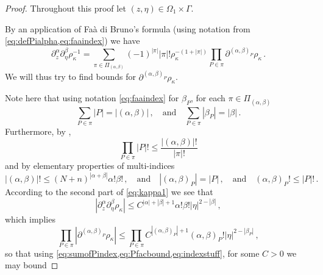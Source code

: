 \documentclass[
	fontsize=11pt, 
	twoside=false, 
	abstract=true, 
	a4paper,
]{scrartcl}
\newcommand{\abs}[1]{\left\lvert#1\right\rvert}
\newcommand{\del}{\partial}
\newcommand{\an}{\quad\text{and}\quad}
\begin{document}
\begin{proof} Throughout this proof let $(z,\eta) \in \Omega_1\times\Gamma$.

	By an application of Fa\`a di Bruno's formula (using notation from \cref{eq:defPialpha,eq:faaindex}) we have
	\begin{equation}\label{eq:applybruno}
		\del^\alpha_z\del^\beta_\eta\rho_\kappa^{-1} = \sum_{\pi\in\Pi_{(\alpha,\beta)}}(-1)^{\abs{\pi}}\abs{\pi}!\rho_\kappa^{-(1+\abs{\pi})}\prod_{P\in\pi} \del^{(\alpha,\beta)_P}\rho_\kappa\,.
	\end{equation}
	We will thus try to find bounds for $\del^{(\alpha,\beta)_P}\rho_\kappa$.

	Note here that using notation \cref{eq:faaindex} for $\beta_P$, for each $\pi \in \Pi_{(\alpha,\beta)}$ %
	\begin{equation}\label{eq:sumofPindex}
		\sum_{P\in\pi}\abs{P} = \abs{(\alpha,\beta)}\,,\an \sum_{P\in\pi}\abs{\beta_P} = \abs{\beta}\,.
	\end{equation}
	Furthermore, by \cite[Eq.~(3.8)]{zbMATH06496469}, %
	\begin{equation}\label{eq:Pfacbound}
		\prod_{P\in\pi} \abs{P}! \leq \frac{\abs{(\alpha,\beta)}!}{\abs{\pi}!}
	\end{equation}
	and by elementary properties of multi-indices
	\begin{equation}\label{eq:indexstuff}
	\abs{(\alpha,\beta)}! \leq (N+n)^{\abs{\alpha+\beta}}\alpha!\beta!\,,\an \abs{(\alpha,\beta)_P} = \abs{P}\,,\an (\alpha,\beta)_P! \leq \abs{P}!\,.
	\end{equation}
	According to the second part of \cref{eq:kappa1} we see that
	\[
		\abs{\del^\alpha_z\del^\beta_\eta \rho_\kappa} \leq C^{\abs{\alpha}+\abs{\beta}+1}\alpha!\beta! \abs{\eta}^{2-\abs{\beta}}\,,
	\]
	which implies 
	\[
	\prod_{P\in\pi}\abs{\del^{(\alpha,\beta)_P}\rho_\kappa}\leq \prod_{P\in\pi} C^{\abs{(\alpha,\beta)_P}+1}(\alpha,\beta)_P!\abs{\eta}^{2-\abs{\beta_P}}\,,
	\]
	so that using \cref{eq:sumofPindex,eq:Pfacbound,eq:indexstuff}, for some $C>0$ we may bound

\end{proof}
\end{document}
